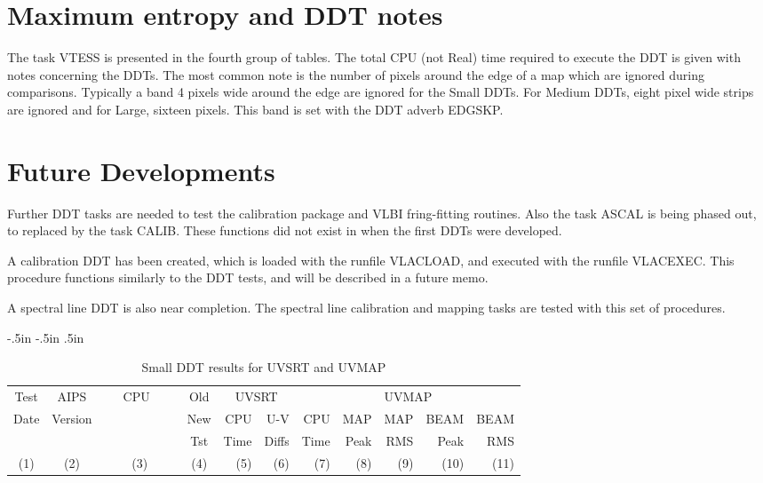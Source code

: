 \section{Maximum entropy and DDT notes}
The task VTESS is presented in the fourth group of tables.
The total CPU (not Real) time required to execute the
DDT is given with notes concerning the DDTs.
The most common note is the number of pixels around the
edge of a map which are ignored during comparisons.
Typically a band 4 pixels wide around the edge are ignored
for the Small DDTs.  For Medium DDTs, eight pixel wide
strips are ignored and for Large, sixteen pixels.
This band is set with the DDT adverb EDGSKP.

\section{Future Developments}
Further DDT tasks are needed to test the \AIPS calibration
package and VLBI fring-fitting routines.
Also the task ASCAL is being phased out, to replaced by the
task CALIB.
These functions did not exist in \AIPS when the first
DDTs were developed.

A calibration DDT has been created, which is loaded with the
runfile VLACLOAD, and executed with the runfile VLACEXEC.
This procedure functions similarly to the DDT tests, and
will be described in a future \AIPS memo.

A spectral line DDT is also near completion.
The spectral line calibration and mapping tasks are tested
with this set of procedures.

\clearpage
\newcommand{\hinch}{\hspace{1in}}
\small

\textwidth 7.2in
\linewidth 7.2in
\marginparsep 0in
\oddsidemargin -.5in
\evensidemargin -.5in
\topmargin .5in
\headheight 0in
\headsep 0in
\textheight 9in
\itemindent 1cm
\parindent 0mm
\baselineskip 7mm

\begin{table}
\begin{center}
\begin{tabular}{cccc|rr|rrrrr}
\hline \hline
Test      &  AIPS    &~~~CPU~~~~& Old  &  \multicolumn{2}{c|}{UVSRT}&   \multicolumn{5}{c}{UVMAP}  \\
  Date    & Version  &          & New  &   CPU    &    U-V    &    CPU    &    MAP    &    MAP    &   BEAM    &   BEAM   \\
          &          &          & Tst  &  Time    &   Diffs   &   Time    &   Peak    &    RMS    &   Peak    &    RMS   \\

  (1)     &   (2)    &  (3)     & (4)  & (5)      &   (6)     &   (7)     &   (8)     &    (9)    &   (10)    &  (11)   \\
\hline

\hline \hline
\end{tabular}
\end{center}
\caption{Small DDT results for UVSRT and UVMAP}
\end{table}


